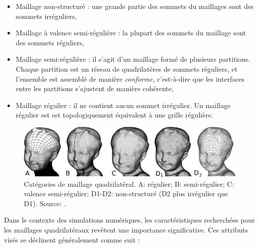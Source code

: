  \begin{itemize}
    \item Maillage non-structuré : une grande partie des sommets du maillages sont des sommets irréguliers,\\
    \item Maillage à valence semi-régulière : la plupart des sommets du maillage sont des sommets réguliers,\\
    \item Maillage semi-régulière : il s'agit d'un maillage formé de plusieurs partitions. Chaque partition est un réseau de quadrilatères de sommets réguliers, et l'ensemble est assemblé de manière \emph{conforme}, c'est-à-dire que les interfaces entre les partitions s'ajustent de manière cohérente,\\
    \item Maillage régulier :  il ne contient aucun sommet irrégulier. Un maillage régulier est est topologiquement équivalent à une grille régulière.\\
 \end{itemize}
 
\begin{figure}[!h]
    \centering
    \includegraphics[scale=5.2]{images/Quad_meshes_categories.png}
    \caption{Catégories de maillage quadrilatéral. A: régulier; B: semi-régulier; C: valence semi-régulier; D1-D2: non-structuré (D2 plus irrégulier que D1). Source: \cite{bommes2013quad}.}
    \label{fig:Quad_meshes_categories}
\end{figure}


Dans le contexte des simulations numériques, les caractéristiques recherchées pour les maillages quadrilatéraux revêtent une importance significative. Ces attributs visés se déclinent généralement comme suit :\\

